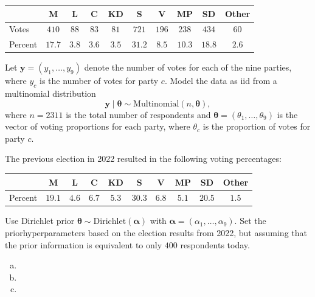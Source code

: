 \documentclass[
  letterpaper,
  DIV=11,
  numbers=noendperiod]{scrartcl}
\begin{document}
\begin{tabular}{lccccccccc}
& M & L & C & KD & S & V & MP & SD & Other \\
\hline 
Votes &      $410$   & $88$    & $83$    & $81$    & $721$   & $196$ & $238$ & $434$ & $60$ \\
Percent & $17.7$ & $3.8$ & $3.6$ & $3.5$ & $31.2$ & $8.5$ & $10.3$ & $18.8$ & $2.6$
\end{tabular}
\vspace{0.3cm}

Let \(\boldsymbol{y} = (y_1,\ldots,y_9)\) denote the number of votes for
each of the nine parties, where \(y_c\) is the number of votes for party
\(c\). Model the data as iid from a multinomial distribution
\begin{equation*}
    \boldsymbol{y} \mid \boldsymbol{\theta} \sim \mathrm{Multinomial}(n,\boldsymbol{\theta}),
\end{equation*} where \(n=2311\) is the total number of respondents and
\(\boldsymbol{\theta} = (\theta_1,\ldots,\theta_9)\) is the vector of
voting proportions for each party, where \(\theta_c\) is the proportion
of votes for party \(c\).

The previous election in 2022 resulted in the following voting
percentages: \vspace{0.3cm}

\begin{tabular}{lccccccccc}
\scriptsize
& M & L & C & KD & S & V & MP & SD & Other \\
\hline 
Percent & $19.1$ & $4.6$ & $6.7$ & $5.3$ & $30.3$ & $6.8$ & $5.1$ & $20.5$ & $1.5$
\end{tabular}
\vspace{0.3cm}

Use Dirichlet prior
\(\boldsymbol{\theta} \sim \mathrm{Dirichlet}(\boldsymbol{\alpha})\)
with \(\boldsymbol{\alpha} = (\alpha_1,\ldots,\alpha_9)\). Set the
priorhyperparameters based on the election results from 2022, but
assuming that the prior information is equivalent to only \(400\)
respondents today.

\begin{enumerate}[(a)]
    \item   
    \item   
    \item   
\end{enumerate}
\end{document}
